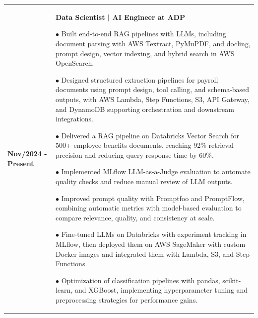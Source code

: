 \documentclass[a4paper,10pt]{article}
\begin{document}
\begin{longtable}{p{}|p{}}

\textbf{Nov/2024 - Present} &
\textbf{\large Data Scientist | AI Engineer at ADP} \par
$\bullet$ Built end-to-end RAG pipelines with LLMs, including document parsing with AWS Textract, PyMuPDF, and docling, prompt design, vector indexing, and hybrid search in AWS OpenSearch.\par

\vspace{1.3pt}


$\bullet$ Designed structured extraction pipelines for payroll documents using prompt design, tool calling, and schema-based outputs, with AWS Lambda, Step Functions, S3, API Gateway, and DynamoDB supporting orchestration and downstream integrations.\par


\vspace{1.3pt}

$\bullet$ Delivered a RAG pipeline on Databricks Vector Search for 500+ employee benefits documents, reaching 92\% retrieval precision and reducing query response time by 60\%.

\vspace{1.3pt}

$\bullet$ Implemented MLflow LLM-as-a-Judge evaluation to automate quality checks and reduce manual review of LLM outputs.\par
\vspace{1.3pt}

$\bullet$ Improved prompt quality with Promptfoo and PromptFlow, combining automatic metrics with model-based evaluation to compare relevance, quality, and consistency at scale.\par


\vspace{1.3pt}

$\bullet$ Fine-tuned LLMs on Databricks with experiment tracking in MLflow, then deployed them on AWS SageMaker with custom Docker images and integrated them with Lambda, S3, and Step Functions.\par

\vspace{1.3pt}

$\bullet$ Optimization of classification pipelines with pandas, scikit-learn, and XGBoost, implementing hyperparameter tuning and preprocessing strategies for performance gains.\par


\end{longtable}
\end{document}
